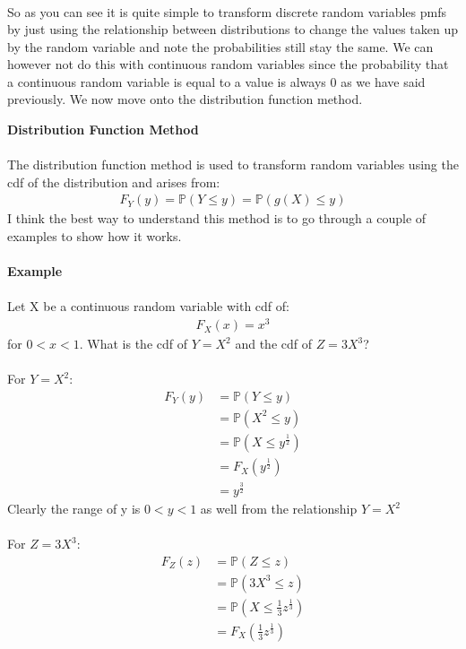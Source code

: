 \documentclass[,oneside]{article}
\begin{document}
\begin{enumerate}
\begin{enumerate}
\begin{align*}
\end{align*}
So as you can see it is quite simple to transform discrete random variables pmfs by just using the relationship between distributions to change the values taken up by the random variable and note the probabilities still stay the same. We can however not do this with continuous random variables since the probability that a continuous random variable is equal to a value is always 0 as we have said previously. We now move onto the distribution function method.\\
\end{enumerate} 
\textbf{Distribution Function Method}\\ \\
The distribution function method is used to transform random variables using the cdf of the distribution and arises from:
\begin{align*}
F_Y(y)=\mathbb{P}(Y \leq y)=\mathbb{P}(g(X) \leq y)
\end{align*}
I think the best way to understand this method is to go through a couple of examples to show how it works.\\ \\
\textbf{Example}\\ \\
Let X be a continuous random variable with cdf of:
\begin{align*}
F_X(x)=x^3
\end{align*}
for $0 < x < 1$. What is the cdf of $Y=X^2$ and the cdf of $Z=3X^3$?\\ \\
For $Y=X^2$:
\begin{align*}
F_Y(y)&= \mathbb{P}(Y \leq y) \\
&= \mathbb{P}(X^2 \leq y)\\
&= \mathbb{P}(X \leq y^{\frac{1}{2}})\\
&= F_X(y^{\frac{1}{2}})\\
&= y^{\frac{3}{2}}
\end{align*}
Clearly the range of y is $0 < y < 1$ as well from the relationship $Y = X^2$\\ \\
For $Z=3X^3$:
\begin{align*}
F_Z(z)&= \mathbb{P}(Z \leq z) \\
&= \mathbb{P}(3X^3 \leq z)\\
&= \mathbb{P}(X \leq \frac{1}{3}z^{\frac{1}{3}})\\
&= F_X(\frac{1}{3}z^{\frac{1}{3}})\\

\end{align*}
\end{enumerate}
\end{document}
